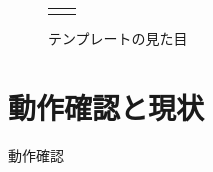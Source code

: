 \begin{figure}[H]
\begin{tabular}{cc}
\begin{minipage}[b]{0.45\textwidth}
			\caption{テンプレートの見た目}\label{fig_pc_template}
		\end{minipage}
	\end{tabular}
\end{figure}



\section{動作確認と現状}
動作確認
